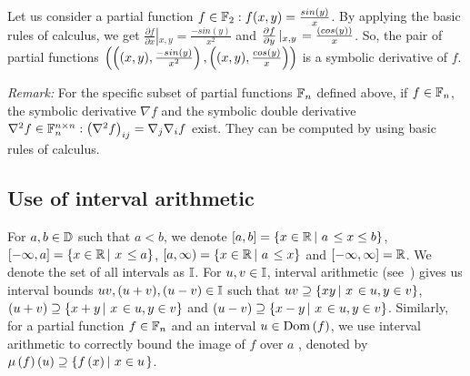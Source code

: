 %
\begin{example}
Let us consider a partial function $f\in\mathbb{F}_{2}: f(x,y) =
\frac{sin\left(y\right)}{x}$.  By applying the basic rules of calculus, we get
$\frac{\partial{f}}{\partial{x}}\left|_{x,y}\right. =
\frac{-sin(y)}{x^2}$ and
$\frac{\partial{f}}{\partial{y}}\left|_{x,y}\right. =
\frac{\left(cos(y)\right)}{x}$. So, the pair of partial functions $\left(
  \left((x,y),\frac{-sin(y)}{x^2}\right), \left((x,y), \frac{{cos(y)}}{x}\right) \right)$
  is a symbolic derivative of $f$.  
\end{example}
%
\emph{Remark:}  For the specific subset of partial functions $\mathbb{F}_{n}$
  defined above,
  if $f\in\mathbb{F}_{n}$, the symbolic derivative $\nabla{f}$ and the
symbolic double derivative $\nabla^2f\in\mathbb{F}_{n}^{n\times
n}: \left(\nabla^2 f\right)_{ij} =
\nabla_j\nabla_i f$ exist.  They can be computed by using
basic rules of calculus.
%
\subsection{Use of interval arithmetic}
For $a,b\in\mathbb{D}$ such that $a<b$, we denote $\left[a,b\right] =
\left\{x\in\mathbb{R}\left|~a\right.\leq x\leq b\right\}$, $[-\infty,a] = \left\{x\in\mathbb{R}\left|~x\right.\leq a\right\}$, $[a,\infty) = \left\{x\in\mathbb{R}\left|~a\right.\leq x\right\}$ and
  $[-\infty,\infty] = \mathbb{R}$.  We denote the set of all intervals as
  $\mathbb{I}$.  For $u,v\in\mathbb{I}$, interval arithmetic
  (see~\cite{bronnimann2006design}) gives us interval bounds
  $uv,(u+v),(u-v)\in\mathbb{I}$ such that $uv\supseteq\left\{xy\left|~x\right.\in
    u, y\in v\right\}$, $\left(u+v\right)\supseteq\left\{x+y\left|~x\right.\in u, y\in v\right\}$ and
  $\left(u-v\right)\supseteq\left\{x-y\left|~x\right.\in u, y\in v\right\}$.  Similarly, for a
  partial function $f\in \mathbb{F}_{n}$ and an interval $u\in\operatorname{Dom}\left(f\right)$, we use
  interval arithmetic to correctly bound the image of $f$ over $a$ ,
  denoted by $\mu\left(f\right)\left(u\right) \supseteq \left\{f\left(x\right)\left|~x\in u\right. \right\}$.


